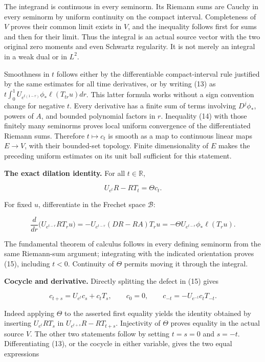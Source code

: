 \documentclass[
  11pt,
]{article}
\begin{document}
The integrand is continuous in every seminorm. Its Riemann sums are
Cauchy in every seminorm by uniform continuity on the compact interval.
Completeness of \(V\) proves their common limit exists in \(V\), and the
inequality follows first for sums and then for their limit. Thus the
integral is an actual source vector with the two original zero moments
and even Schwartz regularity. It is not merely an integral in a weak
dual or in \(L^2\).

Smoothness in \(t\) follows either by the differentiable
compact-interval rule justified by the same estimates for all time
derivatives, or by writing (13) as
\(t\int_0^1 U_{e^{t(1-r)}}\phi_*\ell(T_{tr}u)dr\). This latter formula
works without a sign convention change for negative \(t\). Every
derivative has a finite sum of terms involving \(D^j\phi_*\), powers of
\(A\), and bounded polynomial factors in \(r\). Inequality (14) with
those finitely many seminorms proves local uniform convergence of the
differentiated Riemann sums. Therefore \(t\mapsto c_t\) is smooth as a
map to continuous linear maps \(E\to V\), with their bounded-set
topology. Finite dimensionality of \(E\) makes the preceding uniform
estimates on its unit ball sufficient for this statement.

\textbf{The exact dilation identity.} For all \(t\in\mathbb R\),

\[\boxed{U_{e^t}R-RT_t=\Theta c_t.}\tag{15}\]

For fixed \(u\), differentiate in the Frechet space \(\mathscr B\):

\[
\frac{d}{dr}\bigl(U_{e^{t-r}}RT_ru\bigr)
=-U_{e^{t-r}}(DR-RA)T_ru
=-\Theta U_{e^{t-r}}\phi_*\ell(T_ru).
\]

The fundamental theorem of calculus follows in every defining seminorm
from the same Riemann-sum argument; integrating with the indicated
orientation proves (15), including \(t<0\). Continuity of \(\Theta\)
permits moving it through the integral.

\textbf{Cocycle and derivative.} Directly splitting the defect in (15)
gives

\[
\boxed{c_{t+s}=U_{e^t}c_s+c_tT_s,\qquad
c_0=0,\qquad
c_{-t}=-U_{e^{-t}}c_tT_{-t}.}\tag{16}
\]

Indeed applying \(\Theta\) to the asserted first equality yields the
identity obtained by inserting \(U_{e^t}RT_s\) in
\(U_{e^{t+s}}R-RT_{t+s}\). Injectivity of \(\Theta\) proves equality in
the actual source \(V\). The other two statements follow by setting
\(t=s=0\) and \(s=-t\). Differentiating (13), or the cocycle in either
variable, gives the two equal expressions
\end{document}
